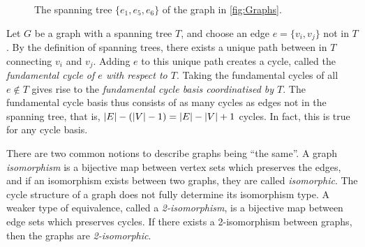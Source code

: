 \documentclass[12pt]{report}
\theoremstyle{definition}
\DeclarePairedDelimiter\abs{\lvert}{\rvert}
\theoremstyle{upright}
\begin{document}
\begin{figure}[htbp]

    \begin{center}
    
        
    \end{center}

    \caption{The spanning tree $\{e_1, e_5, e_6\}$ of the graph in \cref{fig:Graphs}.}\label{fig:SpanningTree}

\end{figure}

Let $G$ be a graph with a spanning tree $T$, and choose an edge $e=\{v_i, v_j\}$ not in $T$. By the definition of spanning trees, there exists a unique path between in $T$ connecting $v_i$ and $v_j$.
Adding $e$ to this unique path creates a cycle, called the \textit{fundamental cycle of $e$ with respect to $T$}.
Taking the fundamental cycles of all $e\not\in T$ gives rise to the \textit{fundamental cycle basis coordinatised by $T$}.
The fundamental cycle basis thus consists of as many cycles as edges not in the spanning tree, that is, $\abs*{E}-(\abs*{V}-1)=\abs*{E}-\abs*{V}+1$ cycles.
In fact, this is true for any cycle basis.

There are two common notions to describe graphs being ``the same''.
A graph \textit{isomorphism} is a bijective map between vertex sets which preserves the edges, and if an isomorphism exists between two graphs, they are called \textit{isomorphic}.
The cycle structure of a graph does not fully determine its isomorphism type.
A weaker type of equivalence, called a \textit{2-isomorphism}, is a bijective map between edge sets which preserves cycles. If there exists a 2-isomorphism between graphs, then the graphs are \textit{2-isomorphic}.
\end{document}
